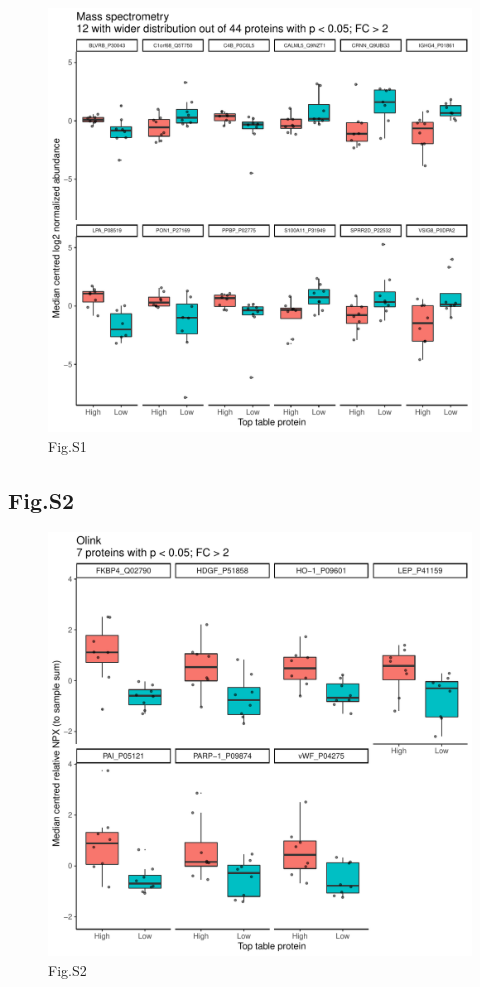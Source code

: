 \documentclass[
]{article}
\begin{document}
\begin{figure}
\centering
\includegraphics[width=1\textwidth,height=\textheight]{../out_r/008_boxplot_p005_FC_2_sign_DEqMS_wider_dist_eq_med_norm.pdf}
\caption{Fig.S1}
\end{figure}

\hypertarget{fig.s2}{%
\subsection{Fig.S2}\label{fig.s2}}

\begin{figure}
\centering
\includegraphics[width=1\textwidth,height=\textheight]{../out_r/008_boxplot_p005_FC_2_sign_ttest_pea_eq_med_norm.pdf}
\caption{Fig.S2}
\end{figure}
\end{document}
